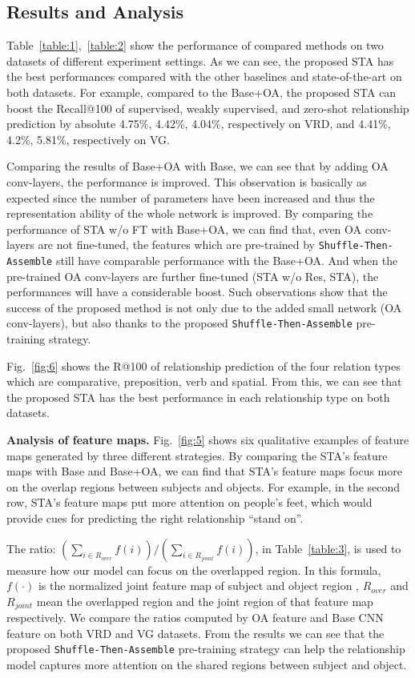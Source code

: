 \documentclass[runningheads]{llncs}
\begin{document}
\subsection{Results and Analysis}
Table~\ref{table:1},~\ref{table:2} show the performance of compared methods on two datasets of different experiment settings. As we can see, the proposed STA has the best performances compared with the other baselines and state-of-the-art on both datasets. For example, compared to the Base+OA, the proposed STA can boost the Recall@100 of supervised, weakly supervised, and zero-shot relationship prediction by absolute 4.75\%, 4.42\%, 4.04\%, respectively on VRD, and 4.41\%, 4.2\%, 5.81\%, respectively on VG.

Comparing the results of Base+OA with Base, we can see that by adding OA conv-layers, the performance is improved. This observation is basically as expected since the number of parameters have been increased and thus the representation ability of the whole network is improved. By comparing the performance of STA w/o FT with Base+OA, we can find that, even OA conv-layers are not fine-tuned, the features which are pre-trained by \texttt{Shuffle-Then-Assemble} still have comparable performance with the Base+OA. And when the pre-trained OA conv-layers are further fine-tuned (STA w/o Res, STA), the performances will have a considerable boost. Such observations show that the success of the proposed method is not only due to the added small network (OA conv-layers), but also thanks to the proposed \texttt{Shuffle-Then-Assemble} pre-training strategy. 

Fig.~\ref{fig:6} shows the R@100 of relationship prediction of the four relation types which are comparative, preposition, verb and spatial. From this, we can see that the proposed STA has the best performance in each relationship type on both datasets. 

\textbf{Analysis of feature maps.}
Fig.~\ref{fig:5} shows six qualitative examples of feature maps generated by three different strategies. By comparing the STA's feature maps with Base and Base+OA, we can find that STA's feature maps focus more on the overlap regions between subjects and objects. For example, in the second row, STA's feature maps put more attention on people's feet, which would provide cues for predicting the right relationship ``stand on''.

The ratio: $(\sum\nolimits_{i \in R_{over}}{f(i)})/({\sum\nolimits_{i \in R_{joint}}f(i)})$, in Table~\ref{table:3}, is used to measure how our model can focus on the overlapped region. In this formula, $f(\cdot)$ is the normalized joint feature map of subject and object region , $R_{over}$ and $R_{joint}$ mean the overlapped region and the joint region of that feature map respectively. We compare the ratios computed by OA feature and Base CNN feature on both VRD and VG datasets. From the results we can see that the proposed \texttt{Shuffle-Then-Assemble} pre-training strategy can help the relationship model captures more attention on the shared regions between subject and object.
\end{document}
